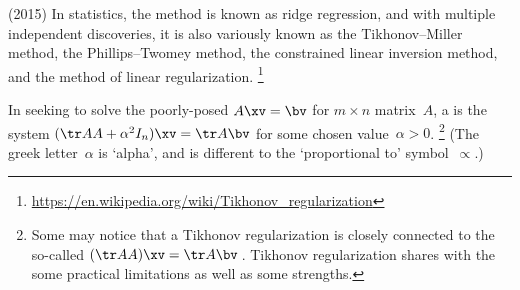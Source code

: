 \begin{quoted}{ (2015)}
In statistics, the method is known as ridge regression, and with multiple independent discoveries, it is also variously known as the Tikhonov--Miller method, the Phillips--Twomey method, the constrained linear inversion method, and the method of linear regularization.
\footnote{\protect\url{https://en.wikipedia.org/wiki/Tikhonov_regularization}}
\end{quoted}


\begin{definition} \label{def:Tikreg}
In seeking to solve the poorly-posed  \(A\xv=\bv\) for \(m\times n\) matrix~\(A\), 
a  is the system \((\tr AA+\alpha^2I_n)\xv=\tr A\bv\) for some chosen  value~\(\alpha>0\).%
\footnote{Some may notice that a Tikhonov regularization is closely connected to the so-called  \((\tr AA)\xv=\tr A\bv\)\,.  
Tikhonov regularization shares with the  some practical limitations as well as some strengths.}
(The greek letter~\(\alpha\) is `alpha', and is different to the `proportional to' symbol~\(\propto\).)
\end{definition}


